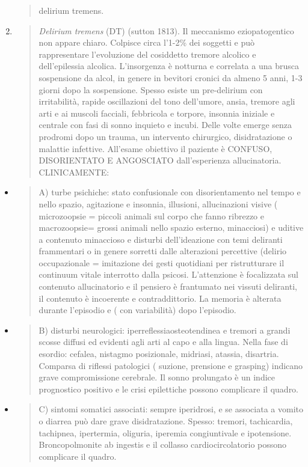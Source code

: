 \documentclass[]{article}
\begin{document}
\begin{enumerate}
\begin{quote}
  delirium tremens.
  \end{quote}
\item
  \begin{quote}
  \emph{Delirium tremens} (DT) (sutton 1813). Il meccanismo
  eziopatogentico non appare chiaro. Colpisce circa l'1-2\% dei soggetti
  e può rappresentare l'evoluzione del cosiddetto tremore alcolico e
  dell'epilessia alcolica. L'insorgenza è notturna e correlata a una
  brusca sospensione da alcol, in genere in bevitori cronici da almeno 5
  anni, 1-3 giorni dopo la sospensione. Spesso esiste un pre-delirium
  con irritabilità, rapide oscillazioni del tono dell'umore, ansia,
  tremore agli arti e ai muscoli facciali, febbricola e torpore,
  insonnia iniziale e centrale con fasi di sonno inquieto e incubi.
  Delle volte emerge senza prodromi dopo un trauma, un intervento
  chirurgico, disidratazione o malattie infettive. All'esame obiettivo
  il paziente è CONFUSO, DISORIENTATO E ANGOSCIATO dall'esperienza
  allucinatoria. CLINICAMENTE:
  \end{quote}
\end{enumerate}

\begin{itemize}
\item
  \begin{quote}
  A) turbe psichiche: stato confusionale con disorientamento nel tempo e
  nello spazio, agitazione e insonnia, illusioni, allucinazioni visive (
  microzoopsie = piccoli animali sul corpo che fanno ribrezzo e
  macrozoopsie= grossi animali nello spazio esterno, minacciosi) e
  uditive a contenuto minaccioso e disturbi dell'ideazione con temi
  deliranti frammentari o in genere sorretti dalle alterazioni
  percettive (delirio occupazionale = imitazione dei gesti quotidiani
  per ristrutturare il continuum vitale interrotto dalla psicosi.
  L'attenzione è focalizzata sul contenuto allucinatorio e il pensiero è
  frantumato nei vissuti deliranti, il contenuto è incoerente e
  contraddittorio. La memoria è alterata durante l'episodio e ( con
  variabilità) dopo l'episodio.
  \end{quote}
\item
  \begin{quote}
  B) disturbi neurologici: iperreflessiaosteotendinea e tremori a grandi
  scosse diffusi ed evidenti agli arti al capo e alla lingua. Nella fase
  di esordio: cefalea, nistagmo posizionale, midriasi, atassia,
  disartria. Comparsa di riflessi patologici ( suzione, prensione e
  grasping) indicano grave compromissione cerebrale. Il sonno prolungato
  è un indice prognostico positivo e le crisi epilettiche possono
  complicare il quadro.
  \end{quote}
\item
  \begin{quote}
  C) sintomi somatici associati: sempre iperidrosi, e se associata a
  vomito o diarrea può dare grave disidratazione. Spesso: tremori,
  tachicardia, tachipnea, ipertermia, oliguria, iperemia congiuntivale e
  ipotensione. Broncopolmonite ab ingestis e il collasso
  cardiocircolatorio possono complicare il quadro.
  \end{quote}
\end{itemize}
\end{document}

